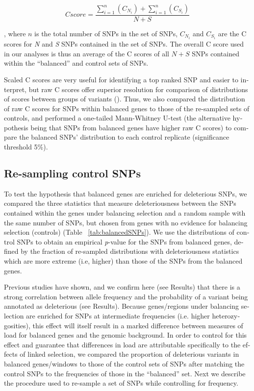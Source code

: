 \begin{refsection}
\begin{otherlanguage}{english}
\begin{equation}
Cscore=\frac{\sum\limits_{i=1}^n(C_{N_{i}})+\sum\limits_{i=1}^n(C_{S_{i}})}
{N+S}
\end{equation}

, where $n$ is the total number of SNPs in the set of SNPs,  $C_{N_{i}}$ and $C_{S_{i}}$ are the C scores for \emph{N} and \emph{S} SNPs contained in the set of SNPs. The overall C score used in our analyses is thus an average of the C scores of all $N+S$ SNPs contained within the \enquote{balanced} and control sets of SNPs.

Scaled C scores are very useful for identifying a top ranked SNP and easier to interpret, but raw C scores  offer superior resolution for comparison of distributions of scores between groups of variants (\cite{Kircher2014}). Thus, we also compared the distribution of raw C scores for SNPs within balanced genes to those of the re-sampled sets of controls, and performed a one-tailed Mann-Whitney U-test (the alternative hypothesis being that SNPs from balanced genes have higher raw C scores) to compare the balanced SNPs' distribution to each control replicate (significance threshold 5\%).

\subsection{Re-sampling control SNPs} 

To test the hypothesis that balanced genes are enriched for deleterious SNPs, we compared the three statistics that measure deleteriousness between the SNPs contained within the genes under balancing selection and a random sample with the same number of SNPs, but chosen from genes with no evidence for balancing selection (controls) (Table ~\ref{tab:balancedSNPs}). We use the distributions of control SNPs to obtain an empirical \emph{p}-value for the SNPs from balanced genes, defined by the fraction of re-sampled distributions with deleteriousness statistics which are more extreme (i.e, higher) than those of the SNPs from the balanced genes.

Previous studies have shown, and we confirm here (see Results) that there is a strong correlation between allele frequency and the probability of a variant being annotated as deleterious (see Results). Because genes/regions under balancing selection are enriched for SNPs at intermediate frequencies (i.e. higher heterozygosities), this effect will itself result in a marked difference between measures of load for balanced genes and the genomic background. In order to control for this effect and guarantee that differences in load are attributable specifically to the effects of linked selection, we compared the proportion of deleterious variants in balanced genes/windows to those of the control sets of SNPs after matching the control SNPs to the frequencies of those in the \enquote{balanced} set. Next we describe the procedure used to re-sample a set of SNPs while controlling for frequency.


\end{otherlanguage}
\end{refsection}
